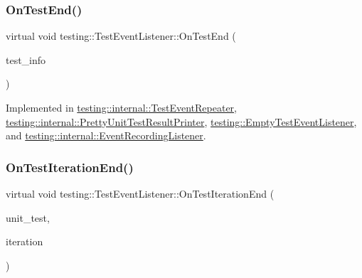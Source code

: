 \subsubsection{\texorpdfstring{On\+Test\+End()}{OnTestEnd()}}
{\footnotesize\ttfamily virtual void testing\+::\+Test\+Event\+Listener\+::\+On\+Test\+End (\begin{DoxyParamCaption}\item[{const \hyperlink{classtesting_1_1_test_info}{Test\+Info} \&}]{test\+\_\+info }\end{DoxyParamCaption})\hspace{0.3cm}{\ttfamily [pure virtual]}}



Implemented in \hyperlink{classtesting_1_1internal_1_1_test_event_repeater_aa0f13bded9369aae1c78583d7276f8b1}{testing\+::internal\+::\+Test\+Event\+Repeater}, \hyperlink{classtesting_1_1internal_1_1_pretty_unit_test_result_printer_a06749ff2b32a16c127374ecd015f13e0}{testing\+::internal\+::\+Pretty\+Unit\+Test\+Result\+Printer}, \hyperlink{classtesting_1_1_empty_test_event_listener_afd58d21005f0d0d0399fb114627545d3}{testing\+::\+Empty\+Test\+Event\+Listener}, and \hyperlink{classtesting_1_1internal_1_1_event_recording_listener_adb076f145cc20d9b27441b9c75da4b81}{testing\+::internal\+::\+Event\+Recording\+Listener}.

\mbox{\label{classtesting_1_1_test_event_listener_a550fdb3e55726e4cefa09f5697941425}} 
\subsubsection{\texorpdfstring{On\+Test\+Iteration\+End()}{OnTestIterationEnd()}}
{\footnotesize\ttfamily virtual void testing\+::\+Test\+Event\+Listener\+::\+On\+Test\+Iteration\+End (\begin{DoxyParamCaption}\item[{const \hyperlink{classtesting_1_1_unit_test}{Unit\+Test} \&}]{unit\+\_\+test,  }\item[{int}]{iteration }\end{DoxyParamCaption})\hspace{0.3cm}{\ttfamily [pure virtual]}}



